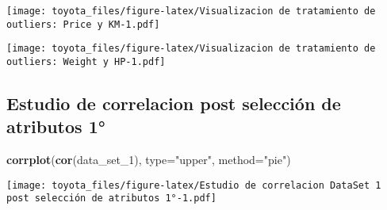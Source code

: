 \documentclass[]{article}
\newenvironment{Shaded}{\begin{snugshade}}{\end{snugshade}}
\newcommand{\DataTypeTok}[1]{\textcolor[rgb]{0.13,0.29,0.53}{#1}}
\newcommand{\DecValTok}[1]{\textcolor[rgb]{0.00,0.00,0.81}{#1}}
\newcommand{\KeywordTok}[1]{\textcolor[rgb]{0.13,0.29,0.53}{\textbf{#1}}}
\newcommand{\NormalTok}[1]{#1}
\newcommand{\OperatorTok}[1]{\textcolor[rgb]{0.81,0.36,0.00}{\textbf{#1}}}
\newcommand{\StringTok}[1]{\textcolor[rgb]{0.31,0.60,0.02}{#1}}
\begin{document}
\begin{Shaded}
\end{Shaded}

\texttt{[image: toyota\_files/figure-latex/Visualizacion de tratamiento de outliers: Price y KM-1.pdf]}

\begin{Shaded}
\end{Shaded}

\texttt{[image: toyota\_files/figure-latex/Visualizacion de tratamiento de outliers: Weight y HP-1.pdf]}

\hypertarget{estudio-de-correlacion-post-seleccion-de-atributos-1}{%
\subsection{Estudio de correlacion post selección de atributos
1°}\label{estudio-de-correlacion-post-seleccion-de-atributos-1}}

\begin{Shaded}
\begin{Highlighting}[]
\KeywordTok{corrplot}\NormalTok{(}\KeywordTok{cor}\NormalTok{(data_set_}\DecValTok{1}\NormalTok{), }\DataTypeTok{type=}\StringTok{"upper"}\NormalTok{, }\DataTypeTok{method=}\StringTok{"pie"}\NormalTok{)}
\end{Highlighting}
\end{Shaded}

\texttt{[image: toyota\_files/figure-latex/Estudio de correlacion DataSet 1 post selección de atributos 1°-1.pdf]}
\end{document}
